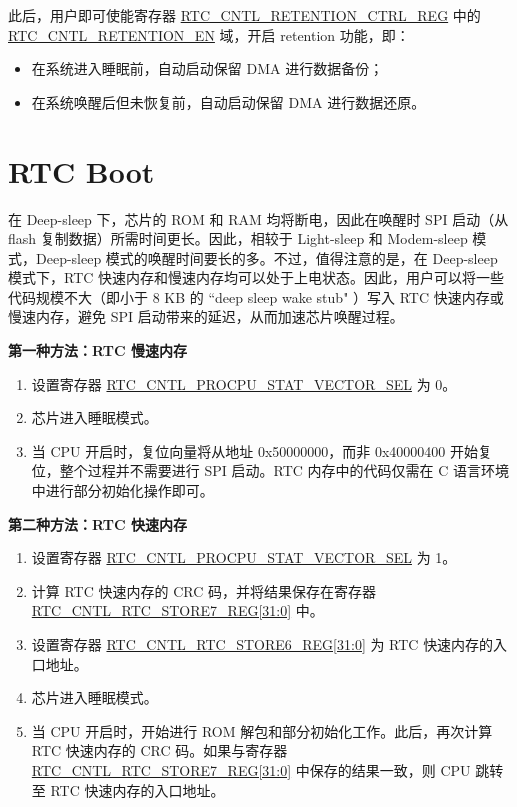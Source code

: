 \documentclass[main\_\_CN.tex]{subfiles}
\begin{document}
此后，用户即可使能寄存器 \hyperref[regdesc:RTCCNTLRETENTIONCTRLREG]{RTC\_CNTL\_RETENTION\_CTRL\_REG} 中的 \hyperref[fielddesc:RTCCNTLRETENTIONEN]{RTC\_CNTL\_RETENTION\_EN} 域，开启 retention 功能，即：
\begin{itemize}
    \item 在系统进入睡眠前，自动启动保留 DMA 进行数据备份；
    \item 在系统唤醒后但未恢复前，自动启动保留 DMA 进行数据还原。
\end{itemize}


\section{RTC Boot}
在 Deep-sleep 下，芯片的 ROM 和 RAM 均将断电，因此在唤醒时 SPI 启动（从 flash 复制数据）所需时间更长。因此，相较于 Light-sleep 和 Modem-sleep 模式，Deep-sleep 模式的唤醒时间要长的多。不过，值得注意的是，在 Deep-sleep 模式下，RTC 快速内存和慢速内存均可以处于上电状态。因此，用户可以将一些代码规模不大（即小于 8 KB 的 ``deep sleep wake stub" ）写入 RTC 快速内存或慢速内存，避免 SPI 启动带来的延迟，从而加速芯片唤醒过程。

\textbf{第一种方法：RTC 慢速内存}
\begin{enumerate}
\item 设置寄存器 \hyperref[fielddesc:RTCCNTLPROCPUSTATVECTORSEL]{RTC\_CNTL\_PROCPU\_STAT\_VECTOR\_SEL} 为 0。
\item 芯片进入睡眠模式。
\item 当 CPU 开启时，复位向量将从地址 0x{}50000000，而非 0x{}40000400 开始复位，整个过程并不需要进行 SPI 启动。RTC 内存中的代码仅需在 C 语言环境中进行部分初始化操作即可。
\end{enumerate}


\textbf{第二种方法：RTC 快速内存}
\begin{enumerate}
\item 设置寄存器 \hyperref[fielddesc:RTCCNTLPROCPUSTATVECTORSEL]{RTC\_CNTL\_PROCPU\_STAT\_VECTOR\_SEL} 为 1。
\item 计算 RTC 快速内存的 CRC 码，并将结果保存在寄存器 \hyperref[regdesc:RTCCNTLRTCSTORE7REG]{RTC\_CNTL\_RTC\_STORE7\_REG[31:0]} 中。
\item 设置寄存器 \hyperref[regdesc:RTCCNTLRTCSTORE6REG]{RTC\_CNTL\_RTC\_STORE6\_REG[31:0]} 为 RTC 快速内存的入口地址。
\item 芯片进入睡眠模式。
\item 当 CPU 开启时，开始进行 ROM 解包和部分初始化工作。此后，再次计算 RTC 快速内存的 CRC 码。如果与寄存器 \hyperref[regdesc:RTCCNTLRTCSTORE7REG]{RTC\_CNTL\_RTC\_STORE7\_REG[31:0]} 中保存的结果一致，则 CPU 跳转至 RTC 快速内存的入口地址。
\end{enumerate}
\end{document}
